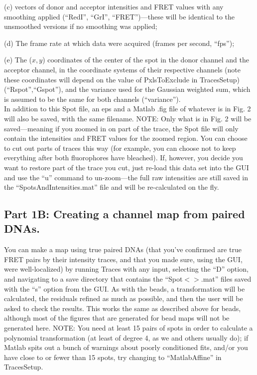 \documentclass[11pt]{article}
\begin{document}
(c) vectors of donor and acceptor intensities and FRET values with any smoothing applied (``RedI'', ``GrI'', ``FRET'')---these will be identical to the unsmoothed versions if no smoothing was applied;

(d) The frame rate at which data were acquired (frames per second, ``fps'');

(e) The ($x,y$) coordinates of the center of the spot in the donor channel and the acceptor channel, in the coordinate systems of their respective channels (note these coordinates will depend on the value of PxlsToExclude in TracesSetup) (``Rspot'',``Gspot''), and the variance used for the Gaussian weighted sum, which is assumed to be the same for both channels (``variance'').\\

\noindent In addition to this Spot file, an eps and a Matlab .fig file of whatever is in Fig. 2 will also be saved, with the same filename.  NOTE: Only what is in Fig. 2 will be saved---meaning if you zoomed in on part of the trace, the Spot file will only contain the intensities and FRET values for the zoomed region.  You can choose to cut out parts of traces this way (for example, you can choose not to keep everything after both fluorophores have bleached).  If, however, you decide you want to restore part of the trace you cut, just re-load this data set into the GUI and use the ``u'' command to un-zoom---the full raw intensities are still saved in the ``SpotsAndIntensities.mat'' file and will be re-calculated on the fly.

\subsection{Part 1B: Creating a channel map from paired DNAs.}

You can make a map using true paired DNAs (that you've confirmed are true FRET pairs by their intensity traces, and that you made sure, using the GUI, were well-localized) by running Traces with any input,  selecting the ``D'' option, and navigating to a save directory that contains the ``Spot$<$$>$.mat'' files saved with the ``s'' option from the GUI.  As with the beads, a transformation will be calculated, the residuals refined as much as possible, and then the user will be asked to check the results.  This works the same as described above for beads, although most of the figures that are generated for bead maps will not be generated here.   NOTE: You need at least 15 pairs of spots in order to calculate a polynomial transformation (at least of degree 4, as we and others usually do); if Matlab spits out a bunch of warnings about poorly conditioned fits, and/or you have close to or fewer than 15 spots, try changing to ``MatlabAffine'' in TracesSetup.
\end{document}
